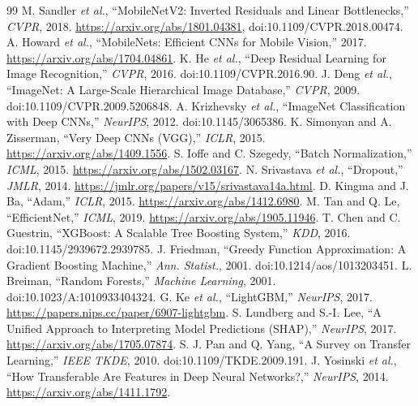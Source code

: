\documentclass[12pt]{article}
\begin{document}
\begin{thebibliography}{99}
\small
{} M. Sandler \emph{et al.}, ``MobileNetV2: Inverted Residuals and Linear Bottlenecks,'' \emph{CVPR}, 2018. \url{https://arxiv.org/abs/1801.04381}, doi:10.1109/CVPR.2018.00474.
 A. Howard \emph{et al.}, ``MobileNets: Efficient CNNs for Mobile Vision,'' 2017. \url{https://arxiv.org/abs/1704.04861}.
 K. He \emph{et al.}, ``Deep Residual Learning for Image Recognition,'' \emph{CVPR}, 2016. doi:10.1109/CVPR.2016.90.
 J. Deng \emph{et al.}, ``ImageNet: A Large-Scale Hierarchical Image Database,'' \emph{CVPR}, 2009. doi:10.1109/CVPR.2009.5206848.
 A. Krizhevsky \emph{et al.}, ``ImageNet Classification with Deep CNNs,'' \emph{NeurIPS}, 2012. doi:10.1145/3065386.
 K. Simonyan and A. Zisserman, ``Very Deep CNNs (VGG),'' \emph{ICLR}, 2015. \url{https://arxiv.org/abs/1409.1556}.
 S. Ioffe and C. Szegedy, ``Batch Normalization,'' \emph{ICML}, 2015. \url{https://arxiv.org/abs/1502.03167}.
 N. Srivastava \emph{et al.}, ``Dropout,'' \emph{JMLR}, 2014. \url{https://jmlr.org/papers/v15/srivastava14a.html}.
 D. Kingma and J. Ba, ``Adam,'' \emph{ICLR}, 2015. \url{https://arxiv.org/abs/1412.6980}.
 M. Tan and Q. Le, ``EfficientNet,'' \emph{ICML}, 2019. \url{https://arxiv.org/abs/1905.11946}.
 T. Chen and C. Guestrin, ``XGBoost: A Scalable Tree Boosting System,'' \emph{KDD}, 2016. doi:10.1145/2939672.2939785.
 J. Friedman, ``Greedy Function Approximation: A Gradient Boosting Machine,'' \emph{Ann. Statist.}, 2001. doi:10.1214/aos/1013203451.
 L. Breiman, ``Random Forests,'' \emph{Machine Learning}, 2001. doi:10.1023/A:1010933404324.
 G. Ke \emph{et al.}, ``LightGBM,'' \emph{NeurIPS}, 2017. \url{https://papers.nips.cc/paper/6907-lightgbm}.
 S. Lundberg and S.-I. Lee, ``A Unified Approach to Interpreting Model Predictions (SHAP),'' \emph{NeurIPS}, 2017. \url{https://arxiv.org/abs/1705.07874}.
 S. J. Pan and Q. Yang, ``A Survey on Transfer Learning,'' \emph{IEEE TKDE}, 2010. doi:10.1109/TKDE.2009.191.
 J. Yosinski \emph{et al.}, ``How Transferable Are Features in Deep Neural Networks?,'' \emph{NeurIPS}, 2014. \url{https://arxiv.org/abs/1411.1792}.

\end{thebibliography}
\end{document}
